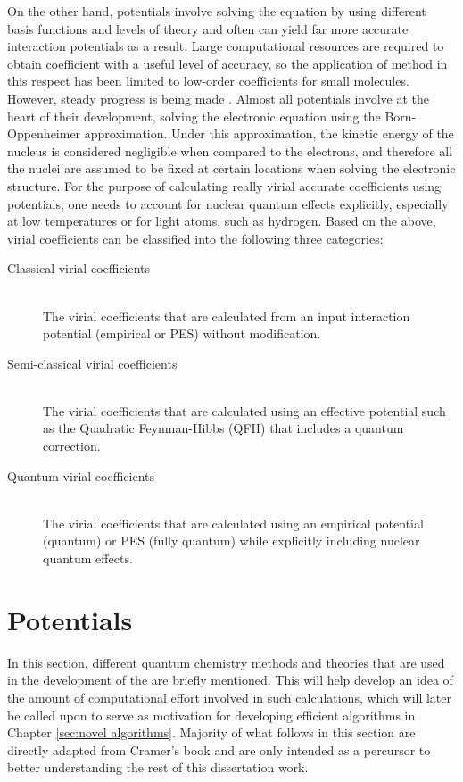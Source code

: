         On the other hand, \abInitio{} potentials involve solving the \Schrodinger{} equation by using different basis functions and levels of theory and often can yield far more accurate interaction potentials as a result. Large computational resources are required to obtain coefficient with a useful level of accuracy, so the application of \abInitio{} method in this respect has been limited to low-order coefficients for small molecules. However, steady progress is being made \cite{Boothroyd2003,Hodges2004,Garberoglio2012,Shaul2012,Garberoglio2013,Hellmann2013,Garberoglio2014,Garberoglio2014mix,Hellmann2014,Schultz2015,Tat2015}. Almost all \abInitio{} potentials involve at the heart of their development, solving the electronic \Schrodinger{} equation using the Born-Oppenheimer approximation. Under this approximation, the kinetic energy of the nucleus is considered negligible when compared to the electrons, and therefore all the nuclei are assumed to be fixed at certain locations when solving the electronic structure. For the purpose of calculating really virial accurate coefficients using \abInitio{} potentials, one needs to account for nuclear quantum effects explicitly, especially at low temperatures or for light atoms, such as hydrogen. Based on the above, virial coefficients can be classified into the following three categories: 

        \begin{description}
            \item[Classical virial coefficients] \hfill \\
                The virial coefficients that are calculated from an input interaction potential (empirical or \abInitio{} PES) without modification.
            \item[Semi-classical virial coefficients] \hfill \\
                The virial coefficients that are calculated using an effective potential such as the Quadratic Feynman-Hibbs (QFH) \cite{Feynman} that includes a quantum correction.
            \item[Quantum virial coefficients] \hfill \\
                The virial coefficients that are calculated using an empirical potential (quantum) or \abInitio{} PES (fully quantum) while explicitly including nuclear quantum effects.
        \end{description}
    \section{\AbInitio{} Potentials}
        In this section, different quantum chemistry methods and theories that are used in the development of the \abInitio{} \PESs are briefly mentioned. This will help develop an idea of the amount of computational effort involved in such calculations, which will later be called upon to serve as motivation for developing efficient algorithms in Chapter \ref{sec:novel algorithms}. Majority of what follows in this section are directly adapted from Cramer's \cite{Cramer} book and are only intended as a percursor to better understanding the rest of this dissertation work.\\

